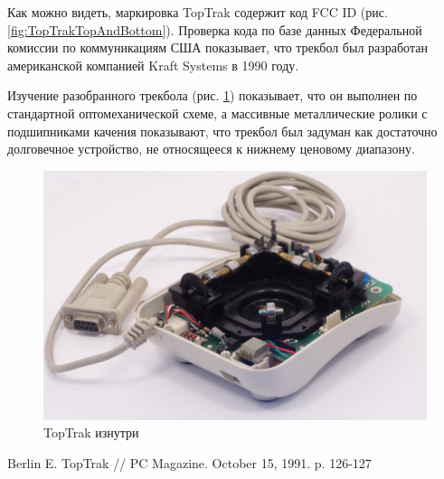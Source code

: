 \documentclass[11pt, a4paper]{article}
\begin{document}
Как можно видеть, маркировка TopTrak содержит код FCC ID (рис. \ref{fig:TopTrakTopAndBottom}). Проверка кода по базе данных Федеральной комиссии по коммуникациям США показывает, что трекбол был разработан американской компанией Kraft Systems в 1990 году.


Изучение разобранного трекбола (рис. \ref{fig:TopTrakInside}) показывает, что он выполнен по стандартной оптомеханической схеме, а массивные металлические ролики с подшипниками качения показывают, что трекбол был задуман как достаточно долговечное устройство, не относящееся к нижнему ценовому диапазону.

\begin{figure}[h]
    \centering
    \includegraphics[scale=0.5]{1990_kraft_toptrack/200.jpg}
    \caption{TopTrak изнутри}
    \label{fig:TopTrakInside}
\end{figure}

\begin{thebibliography}{9}
 Berlin E. TopTrak // PC Magazine. October 15, 1991. p. 126-127
\end{thebibliography}
\end{document}
